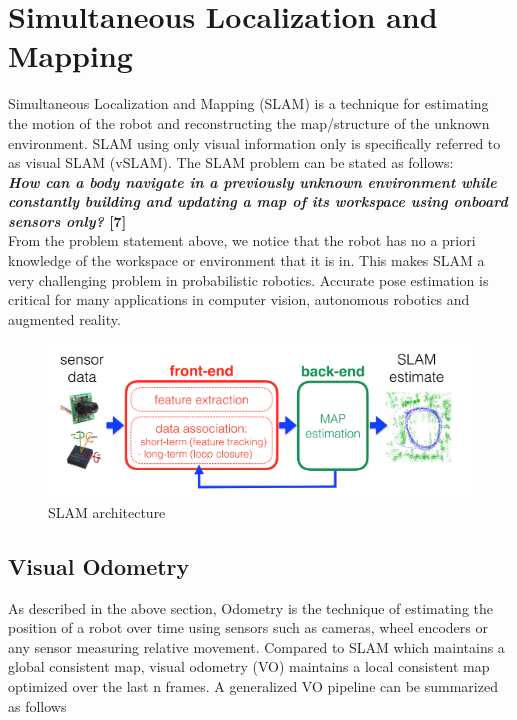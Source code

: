 \section{Simultaneous Localization and Mapping}
\label{slam}

Simultaneous Localization and Mapping (SLAM) is a technique for estimating the motion of the robot and reconstructing the map/structure of the unknown environment. SLAM using only visual information only is specifically referred to as visual SLAM (vSLAM). The SLAM problem can be stated as follows:\\

\textbf{\emph{How can a body navigate in a previously unknown environment while constantly building and updating a map of its workspace using onboard sensors only?} [7]}\\

From the problem statement above, we notice that the robot has no a priori knowledge of the workspace or environment that it is in. This makes SLAM a very challenging problem in probabilistic robotics. Accurate pose estimation is critical for many applications in computer vision, autonomous robotics and augmented reality.
  

\begin{figure}
  \includegraphics[width=\textwidth]{./figures/slam_model.png}
\caption{SLAM architecture}
\label{fig:slammodel}       %
\end{figure}

\subsection{Visual Odometry}

As described in the above section, Odometry is the technique of estimating the position of a robot over time using sensors such as cameras,  wheel encoders or any sensor measuring relative movement. Compared to SLAM which maintains a global consistent map, visual odometry (VO) maintains a local consistent map optimized over the last n frames. A generalized VO pipeline can be summarized as follows

